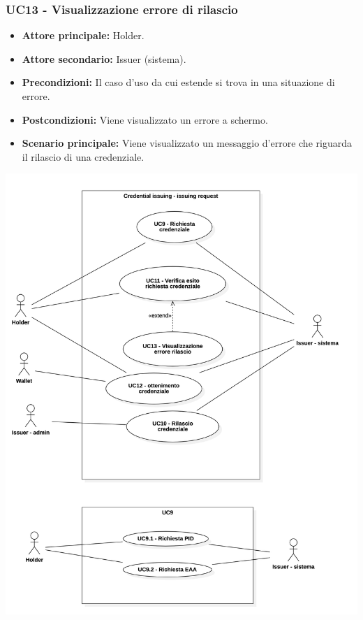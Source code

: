 \subsubsection{UC13 - Visualizzazione errore di rilascio}
\begin{itemize}
    \item \textbf{Attore principale:} Holder.
    \item  \textbf{Attore secondario:} Issuer (sistema).
    \item \textbf{Precondizioni:} Il caso d'uso da cui estende si trova in una situazione di errore.
    \item \textbf{Postcondizioni:} Viene visualizzato un errore a schermo. 
    \item \textbf{Scenario principale:} Viene visualizzato un messaggio d’errore che riguarda il rilascio di una credenziale.
\end{itemize}

\begin{center}
    \includegraphics[scale = 0.3]{./res/img/Credential issuing_request.png}
\end{center}

